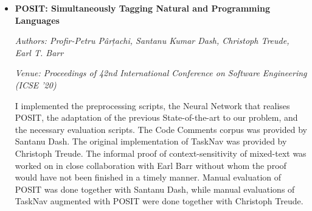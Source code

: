 \begin{itemize}[leftmargin=*]
    \pagebreak
    
    \item[] \noindent\textbf{POSIT: Simultaneously Tagging Natural and
    Programming Languages} 
    
    \noindent\emph{Authors: Profir-Petru Pârțachi, Santanu Kumar Dash, Christoph
    Treude, Earl T. Barr}
    
    \noindent\emph{Venue: Proceedings of 42nd International Conference on
    Software Engineering (ICSE ’20)}

    \noindent I implemented the preprocessing scripts, the Neural Network
    that realises POSIT, the adaptation of the previous State-of-the-art to our
    problem, and the necessary evaluation scripts. The Code Comments corpus was
    provided by Santanu Dash. The original implementation of TaskNav was
    provided by Christoph Treude. The informal proof of context-sensitivity of
    mixed-text was worked on in close collaboration with Earl Barr without whom
    the proof would have not been finished in a timely manner. Manual evaluation
    of POSIT was done together with Santanu Dash, while manual evaluations of
    TaskNav augmented with POSIT were done together with Christoph Treude.

\end{itemize}

